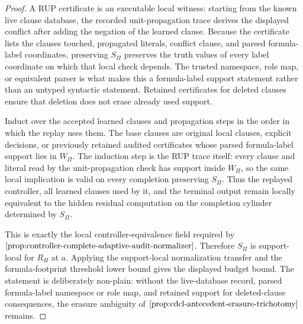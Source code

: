 \documentclass[11pt]{article}
\theoremstyle{definition}
\begin{document}
\begin{proof}
A RUP certificate is an executable local witness: starting from the known live clause database, the recorded unit-propagation trace derives the displayed conflict after adding the negation of the learned clause.  Because the certificate lists the clauses touched, propagated literals, conflict clause, and parsed formula-label coordinates, preserving \(S_\Pi\) preserves the truth values of every label coordinate on which that local check depends.  The trusted namespace, role map, or equivalent parser is what makes this a formula-label support statement rather than an untyped syntactic statement.  Retained certificates for deleted clauses ensure that deletion does not erase already used support.

Induct over the accepted learned clauses and propagation steps in the order in which the replay uses them.  The base clauses are original local clauses, explicit decisions, or previously retained audited certificates whose parsed formula-label support lies in \(W_\Pi\).  The induction step is the RUP trace itself: every clause and literal read by the unit-propagation check has support inside \(W_\Pi\), so the same local implication is valid on every completion preserving \(S_\Pi\).  Thus the replayed controller, all learned clauses used by it, and the terminal output remain locally equivalent to the hidden residual computation on the completion cylinder determined by \(S_\Pi\).

This is exactly the local controller-equivalence field required by \(\Cref{prop:controller-complete-adaptive-audit-normalizer}\).  Therefore \(S_\Pi\) is support-local for \(R_H\) at \(a\).  Applying the support-local normalization transfer and the formula-footprint threshold lower bound gives the displayed budget bound.  The statement is deliberately non-plain: without the live-database record, parsed formula-label namespace or role map, and retained support for deleted-clause consequences, the erasure ambiguity of \(\Cref{prop:cdcl-antecedent-erasure-trichotomy}\) remains.
\end{proof}
\end{document}
